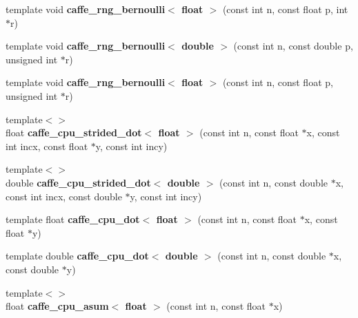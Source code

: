 \begin{DoxyCompactItemize}
\item 
template void {\bfseries caffe\+\_\+rng\+\_\+bernoulli$<$ float $>$} (const int n, const float p, int $\ast$r)\hypertarget{namespacecaffe_a4e8207b9eb53532b11e1b8759f9621fe}{}\label{namespacecaffe_a4e8207b9eb53532b11e1b8759f9621fe}

\item 
template void {\bfseries caffe\+\_\+rng\+\_\+bernoulli$<$ double $>$} (const int n, const double p, unsigned int $\ast$r)\hypertarget{namespacecaffe_a2dbe4c3f8b0cbfe71a275cd962507503}{}\label{namespacecaffe_a2dbe4c3f8b0cbfe71a275cd962507503}

\item 
template void {\bfseries caffe\+\_\+rng\+\_\+bernoulli$<$ float $>$} (const int n, const float p, unsigned int $\ast$r)\hypertarget{namespacecaffe_a0b727625e524d756c165bdae0ca00808}{}\label{namespacecaffe_a0b727625e524d756c165bdae0ca00808}

\item 
{\footnotesize template$<$$>$ }\\float {\bfseries caffe\+\_\+cpu\+\_\+strided\+\_\+dot$<$ float $>$} (const int n, const float $\ast$x, const int incx, const float $\ast$y, const int incy)\hypertarget{namespacecaffe_a48329b51c67eb34f1ea5753784b4296d}{}\label{namespacecaffe_a48329b51c67eb34f1ea5753784b4296d}

\item 
{\footnotesize template$<$$>$ }\\double {\bfseries caffe\+\_\+cpu\+\_\+strided\+\_\+dot$<$ double $>$} (const int n, const double $\ast$x, const int incx, const double $\ast$y, const int incy)\hypertarget{namespacecaffe_a3a2239bd3add4d48d3596ec7dcbe38a2}{}\label{namespacecaffe_a3a2239bd3add4d48d3596ec7dcbe38a2}

\item 
template float {\bfseries caffe\+\_\+cpu\+\_\+dot$<$ float $>$} (const int n, const float $\ast$x, const float $\ast$y)\hypertarget{namespacecaffe_a673482df79e853d1b3e9525004debee3}{}\label{namespacecaffe_a673482df79e853d1b3e9525004debee3}

\item 
template double {\bfseries caffe\+\_\+cpu\+\_\+dot$<$ double $>$} (const int n, const double $\ast$x, const double $\ast$y)\hypertarget{namespacecaffe_ab63a5f29150cb620eb258d8a553767d0}{}\label{namespacecaffe_ab63a5f29150cb620eb258d8a553767d0}

\item 
{\footnotesize template$<$$>$ }\\float {\bfseries caffe\+\_\+cpu\+\_\+asum$<$ float $>$} (const int n, const float $\ast$x)\hypertarget{namespacecaffe_a129b47115ae86ed907940d7fa8fb0576}{}\label{namespacecaffe_a129b47115ae86ed907940d7fa8fb0576}


\end{DoxyCompactItemize}
